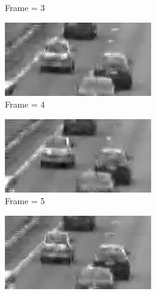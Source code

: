 \documentclass[a4paper, landscape]{article}
\begin{document}
\begin{figure}[H]
\begin{subfigure}{0.13\linewidth}
		\caption{Frame = 3}
	\end{subfigure}
	\begin{subfigure}{0.13\linewidth}
		\centering
		\includegraphics[width=\linewidth]{cars/reconstructed, T = 7, frame = 4.png}
		\caption{Frame = 4}
	\end{subfigure}
	\begin{subfigure}{0.13\linewidth}
		\centering
		\includegraphics[width=\linewidth]{cars/reconstructed, T = 7, frame = 5.png}
		\caption{Frame = 5}
	\end{subfigure}
	\begin{subfigure}{0.13\linewidth}
		\centering
		\includegraphics[width=\linewidth]{cars/reconstructed, T = 7, frame = 6.png}

\end{subfigure}
\end{figure}
\end{document}
